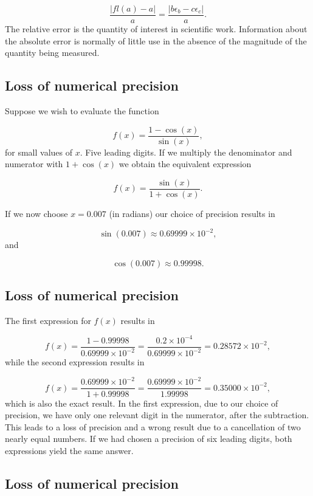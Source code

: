 \documentclass[%
oneside,                 %
final,                   %
10pt]{article}
\begin{document}
{{{{{\begin{equation}
   \frac{ |fl(a)-a|}{a}=\frac{ |b\epsilon_b- c\epsilon_c|}{a}.
\end{equation}
The relative error
is the quantity of interest in scientific work. Information about the
absolute error is normally of little use in the absence of the magnitude
of the quantity being measured.



\subsection{Loss of numerical precision}

Suppose we wish to evaluate the function

\[
   f(x)=\frac{1-\cos(x)}{\sin(x)},
\]
for small values of $x$. Five leading digits. If we multiply the denominator and numerator
with $1+\cos(x)$ we obtain the equivalent expression

\[
   f(x)=\frac{\sin(x)}{1+\cos(x)}.
\]

If we now choose $x=0.007$ (in radians) our choice of precision results in

\[
   \sin(0.007)\approx 0.69999\times 10^{-2},
\]
and

\[
   \cos(0.007)\approx 0.99998.
\]

\subsection{Loss of numerical precision}

The first expression for $f(x)$ results in

\[
   f(x)=\frac{1-0.99998}{0.69999\times 10^{-2}}=\frac{0.2\times 10^{-4}}{0.69999\times 10^{-2}}=0.28572\times 10^{-2},
\]
while the second expression results in

\[
   f(x)=\frac{0.69999\times 10^{-2}}{1+0.99998}=
\frac{0.69999\times 10^{-2}}{1.99998}=0.35000\times 10^{-2},
\]
which is also the exact result. In the first expression, due to our
choice of precision, we have
only one relevant digit in the numerator, after the
subtraction. This leads to a loss of precision and a wrong result due to
a cancellation of two nearly equal numbers.
If we had chosen a precision of six leading digits, both expressions
yield the same answer.

\subsection{Loss of numerical precision}

}}}}}
\end{document}
